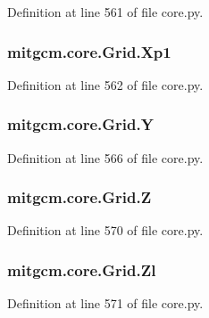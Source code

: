 Definition at line 561 of file core.\+py.

\hypertarget{classmitgcm_1_1core_1_1Grid_ab776eda0111565ec823081cfb9654867}{
\subsubsection[{Xp1}]{\setlength{\rightskip}{0pt plus 5cm}mitgcm.\+core.\+Grid.\+Xp1}}\label{classmitgcm_1_1core_1_1Grid_ab776eda0111565ec823081cfb9654867}


Definition at line 562 of file core.\+py.

\hypertarget{classmitgcm_1_1core_1_1Grid_aee6500dc4e99c849fab046c01a3ba25f}{
\subsubsection[{Y}]{\setlength{\rightskip}{0pt plus 5cm}mitgcm.\+core.\+Grid.\+Y}}\label{classmitgcm_1_1core_1_1Grid_aee6500dc4e99c849fab046c01a3ba25f}


Definition at line 566 of file core.\+py.

\hypertarget{classmitgcm_1_1core_1_1Grid_a7486bee7b120f39baa0bc84e663291fe}{
\subsubsection[{Z}]{\setlength{\rightskip}{0pt plus 5cm}mitgcm.\+core.\+Grid.\+Z}}\label{classmitgcm_1_1core_1_1Grid_a7486bee7b120f39baa0bc84e663291fe}


Definition at line 570 of file core.\+py.

\hypertarget{classmitgcm_1_1core_1_1Grid_aea2f7ddb0b140ad791b7ce7f96569bd9}{
\subsubsection[{Zl}]{\setlength{\rightskip}{0pt plus 5cm}mitgcm.\+core.\+Grid.\+Zl}}\label{classmitgcm_1_1core_1_1Grid_aea2f7ddb0b140ad791b7ce7f96569bd9}


Definition at line 571 of file core.\+py.

